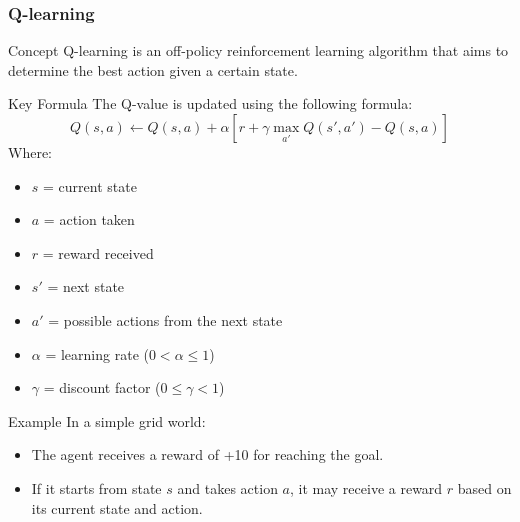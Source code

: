 \documentclass[aspectratio=169]{beamer}
\begin{document}
\begin{frame}[fragile]
    \frametitle{Q-learning}
    \begin{block}{Concept}
        Q-learning is an off-policy reinforcement learning algorithm that aims to determine the best action given a certain state.
    \end{block}

    \begin{block}{Key Formula}
        The Q-value is updated using the following formula:
        \begin{equation}
        Q(s, a) \leftarrow Q(s, a) + \alpha \left[ r + \gamma \max_{a'} Q(s', a') - Q(s, a) \right]
        \end{equation}
        Where:
        \begin{itemize}
            \item $s$ = current state 
            \item $a$ = action taken 
            \item $r$ = reward received 
            \item $s'$ = next state 
            \item $a'$ = possible actions from the next state 
            \item $\alpha$ = learning rate ($0 < \alpha \leq 1$) 
            \item $\gamma$ = discount factor ($0 \leq \gamma < 1$)
        \end{itemize}
    \end{block}
    
    \begin{block}{Example}
        In a simple grid world:
        \begin{itemize}
            \item The agent receives a reward of +10 for reaching the goal.
            \item If it starts from state $s$ and takes action $a$, it may receive a reward $r$ based on its current state and action.
        \end{itemize}
    \end{block}
\end{frame}
\end{document}
